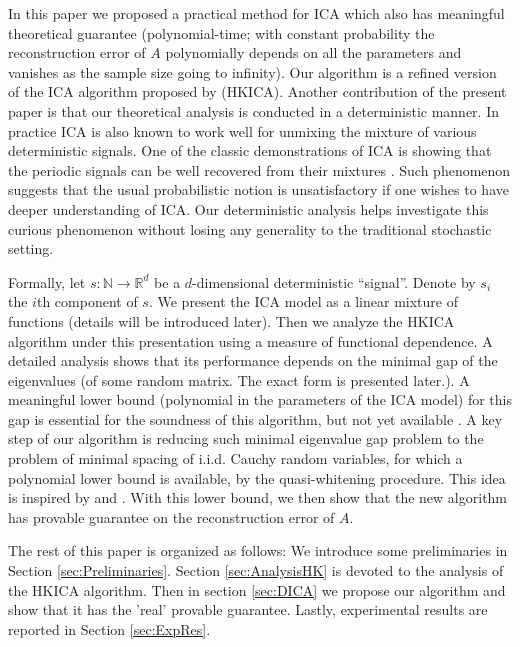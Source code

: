 \documentclass[twoside]{article}
\newcommand{\ra}{\rightarrow}
\newcommand{\real}{\mathbb{R}}
\renewcommand{\natural}{\mathbb{N}}
\theoremstyle{definition}
\begin{document}
In this paper we proposed a practical method for ICA which also has meaningful theoretical guarantee (polynomial-time; with constant probability the reconstruction error of $A$ polynomially depends on all the parameters and vanishes as the sample size going to infinity).
Our algorithm is a refined version of the ICA algorithm proposed by \cite{hsu2013learning} (HKICA).  
Another contribution of the present paper is that our theoretical analysis is conducted in a deterministic manner. 
In practice ICA is also known to work well for unmixing the mixture of various deterministic signals. 
One of the classic demonstrations of ICA is showing that the periodic signals can be well recovered from their mixtures \citep{HyvOja00}.
Such phenomenon suggests that the usual probabilistic notion is unsatisfactory if one wishes to have deeper understanding of ICA.   
Our deterministic analysis helps investigate this curious phenomenon without losing any generality to the traditional stochastic setting. 

Formally, let $s:\natural \ra \real^d$ be a $d$-dimensional deterministic ``signal''. 
Denote by $s_i$ the $i$th component of $s$.
We present the ICA model as a linear mixture of functions (details will be introduced later).
Then we analyze the HKICA algorithm \citep{hsu2013learning} under this presentation using a measure of functional dependence.
A detailed analysis shows that its performance depends on the minimal gap of the eigenvalues (of some random matrix. The exact form is presented later.).
A meaningful lower bound  (polynomial in the parameters of the ICA model) for this gap is essential for the soundness of this algorithm, but not yet available \citep{cardoso1999high}.
A key step of our algorithm is reducing such minimal eigenvalue gap problem to the problem of minimal spacing of i.i.d. Cauchy random variables, for which a polynomial lower bound is available, by the quasi-whitening procedure.
This idea is inspired by \citet{frieze1996learning} and \citet{arora2012provable}.
With this lower bound, we then show that the new algorithm has provable guarantee on the reconstruction error of $A$. 

The rest of this paper is organized as follows: 
We introduce some preliminaries in Section \ref{sec:Preliminaries}. Section \ref{sec:AnalysisHK} is devoted to the analysis of the HKICA algorithm. Then in section \ref{sec:DICA} we propose our algorithm and show that it has the 'real' provable guarantee.
Lastly, experimental results are reported in Section \ref{sec:ExpRes}.
\end{document}
